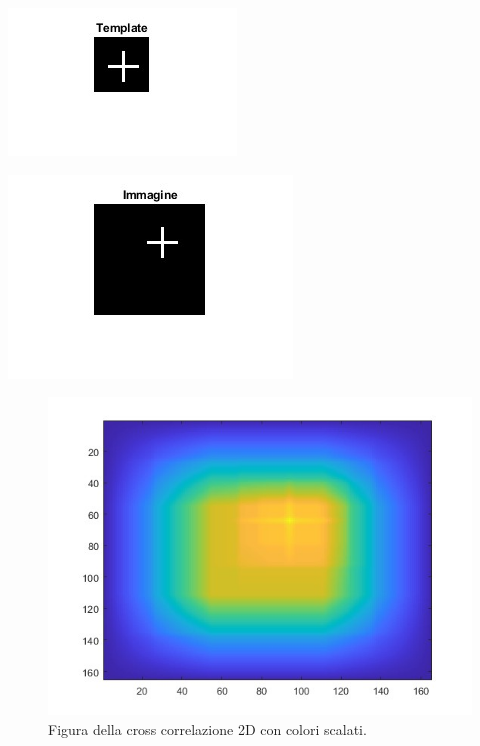 \documentclass[a4paper]{article}
\begin{document}
	\noindent
	\begin{minipage}{.5\textwidth}
		\begin{center}
			\includegraphics[width=.8\textwidth]{img/lab/cross-correlazione2D-5.jpg}
		\end{center}
	\end{minipage}
	\begin{minipage}{.5\textwidth}
		\begin{center}
			\includegraphics[width=.85\textwidth]{img/lab/cross-correlazione2D-6.jpg}
		\end{center}
	\end{minipage}\newpage
	
	\noindent
	\begin{figure}[!htp]
		\centering
		\includegraphics[width=.8\textwidth]{img/lab/cross-correlazione2D-7.jpg}
		\caption{Figura della cross correlazione 2D con colori scalati.}
	\end{figure}\newpage
	
\end{document}
